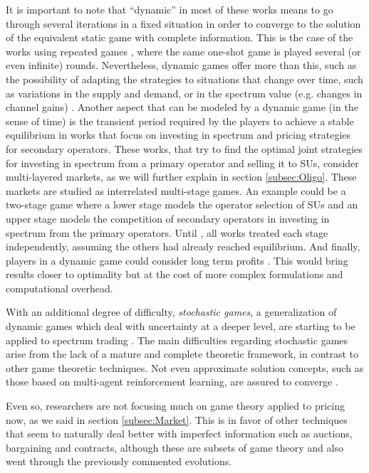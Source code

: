 It is important to note that ``dynamic'' in most of these works means to go through several iterations in a fixed situation in order to converge to the solution of the equivalent static game with complete information. 
This is the case of the works using repeated games \cite{ref:Niyato2007_Game,ref:Niyato2008_Comp,ref:Niyato2009_Dyn,ref:Jia2008,ref:Ji2008}, where the same one-shot game is played several (or even infinite) rounds. 
Nevertheless, dynamic games offer more than this, such as the possibility of adapting the strategies to situations that change over time, such as variations in the supply and demand, or in the spectrum value (e.g. changes in channel gains) \cite{ref:Ji2006}.
Another aspect that can be modeled by a dynamic game (in the sense of time) is the transient period required by the players to achieve a stable equilibrium in works that focus on investing in spectrum and pricing strategies for secondary operators.
These works, that try to find the optimal joint strategies for investing in spectrum from a primary operator and selling it to SUs, consider multi-layered markets, as we will further explain in section \ref{subsec:Oligo}. These markets are studied as interrelated multi-stage games. 
An example could be a two-stage game where a lower stage models the operator selection of SUs and an upper stage models the competition of secondary operators in investing in spectrum from the primary operators. Until \cite{ref:Zhu2012_Dyn}, all works treated each stage independently, assuming the others had already reached equilibrium. 
And finally, players in a dynamic game could consider long term profits \cite{ref:Ji2008,ref:Zhu2012_Dyn,ref:Niyato2008_Comp,ref:Xu2012}.
This would bring results closer to optimality but at the cost of more complex formulations and computational overhead.

With an additional degree of difficulty, \textit{stochastic games}, a generalization of dynamic games which deal with uncertainty at a deeper level, are starting to be applied to spectrum trading \cite{ref:Shen2013}.
The main difficulties regarding stochastic games arise from the lack of a mature and complete theoretic framework, in contrast to other game theoretic techniques.
Not even approximate solution concepts, such as those based on multi-agent reinforcement learning, are assured to converge \cite{ref:Shoham2007}.

Even so, researchers are not focusing much on game theory applied to pricing now, as we said in section \ref{subsec:Market}.
This is in favor of other techniques that seem to naturally deal better with imperfect information such as auctions, bargaining and contracts, although these are subsets of game theory and also went through the previously commented evolutions.

